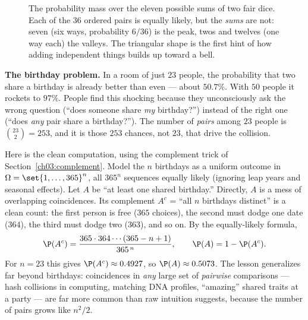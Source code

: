 \begin{figure}[H]
\centering
{}
\caption{The probability mass over the eleven possible sums of two fair dice.
Each of the $36$ ordered pairs is equally likely, but the \emph{sums} are not:
seven (six ways, probability $6/36$) is the peak, twos and twelves (one way each)
the valleys. The triangular shape is the first hint of how adding independent
things builds up toward a bell.}
\label{ch03:fig-dice}
\end{figure}

\begin{paradoxbox}
\textbf{The birthday problem.} In a room of just $23$ people, the probability
that two share a birthday is already better than even --- about $50.7\%$. With
$50$ people it rockets to $97\%$. People find this shocking because they
unconsciously ask the wrong question (``does someone share \emph{my} birthday?'')
instead of the right one (``does \emph{any} pair share a birthday?''). The number
of \emph{pairs} among $23$ people is $\binom{23}{2} = 253$, and it is those $253$
chances, not $23$, that drive the collision.

Here is the clean computation, using the complement trick of
Section~\ref{ch03:complement}. Model the $n$ birthdays as a uniform outcome in
$\Omega = \set{1,\dots,365}^n$, all $365^n$ sequences equally likely (ignoring
leap years and seasonal effects). Let $A$ be ``at least one shared birthday.''
Directly, $A$ is a mess of overlapping coincidences. Its complement $A^c$ =
``all $n$ birthdays distinct'' is a clean count: the first person is free
($365$ choices), the second must dodge one date ($364$), the third must dodge two
($363$), and so on. By the equally-likely formula,
\[
\P(A^c) = \frac{365 \cdot 364 \cdots (365-n+1)}{365^{\,n}}, \qquad
\P(A) = 1 - \P(A^c).
\]
For $n=23$ this gives $\P(A^c) \approx 0.4927$, so $\P(A) \approx 0.5073$. The
lesson generalizes far beyond birthdays: coincidences in \emph{any} large set of
\emph{pairwise} comparisons --- hash collisions in computing, matching DNA
profiles, ``amazing'' shared traits at a party --- are far more common than raw
intuition suggests, because the number of pairs grows like $n^2/2$.
\end{paradoxbox}

